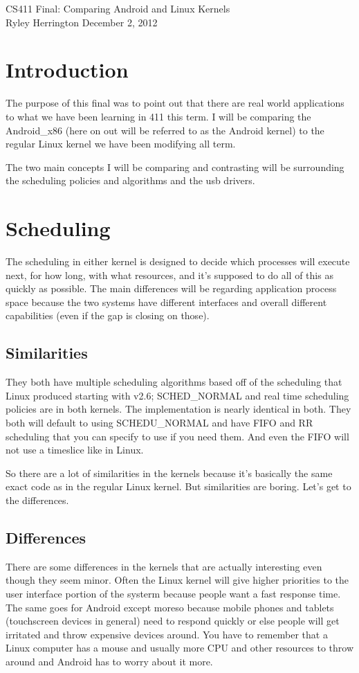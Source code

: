 \documentclass[letterpaper,10pt]{article}
\begin{document}
\begin{center}
{\large CS411 Final: Comparing Android and Linux Kernels} \\ %
Ryley Herrington
December 2, 2012
\end{center}

\section{Introduction}
The purpose of this final was to point out that there are real world applications to what we have been learning in 411 this term. I will be comparing the Android\_x86 (here on out will be referred to as the Android kernel) to the regular Linux kernel we have been modifying all term. 

The two main concepts I will be comparing and contrasting will be surrounding the scheduling policies and algorithms and the usb drivers.

\section{Scheduling}
The scheduling in either kernel is designed to decide which processes will execute next, for how long, with what resources, and it's supposed to do all of this as quickly as possible. The main differences will be regarding application process space because the two systems have different interfaces and overall different capabilities (even if the gap is closing on those).
\subsection{Similarities}
They both have multiple scheduling algorithms based off of the scheduling that Linux produced starting with v2.6; SCHED\_NORMAL and real time scheduling policies are in both kernels. The implementation is nearly identical in both. They both will default to using SCHEDU\_NORMAL and have FIFO and RR scheduling that you can specify to use if you need them. And even the FIFO will not use a timeslice like in Linux. 

So there are a lot of similarities in the kernels because it's basically the same exact code as in the regular Linux kernel. But similarities are boring. Let's get to the differences.  

\subsection{Differences}
There are some differences in the kernels that are actually interesting even though they seem minor. Often the Linux kernel will give higher priorities to the user interface portion of the systerm because people want a fast response time. The same goes for Android except moreso because mobile phones and tablets (touchscreen devices in general) need to respond quickly or else people will get irritated and throw expensive devices around. You have to remember that a Linux computer has a mouse and usually more CPU and other resources to throw around and Android has to worry about it more. 
\end{document}
